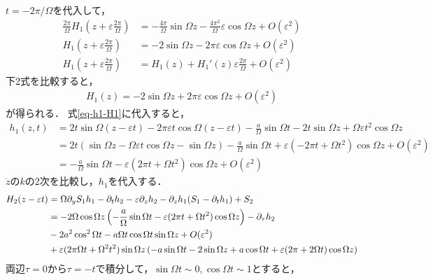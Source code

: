 \documentclass[../main]{subfiles}
\begin{document}
    $t=-2\pi/\Omega$を代入して，
    \begin{align*}
        \frac{2\pi}{\Omega}H_1\left(z+\varepsilon\frac{2\pi}{\Omega}\right)&=-\frac{4\pi}{\Omega}\sin\Omega z-\frac{4\pi^2}{\Omega}\varepsilon \cos \Omega z+O(\varepsilon^2)\\
        H_1\left(z+\varepsilon\frac{2\pi}{\Omega}\right)&=-2 \sin\Omega z-2\pi\varepsilon \cos \Omega z+O(\varepsilon^2)\\
        H_1\left(z+\varepsilon\frac{2\pi}{\Omega}\right)&=H_1(z)+H_1'(z)\varepsilon\frac{2\pi}{\Omega}+O(\varepsilon^2)
    \end{align*}
    下2式を比較すると，
    \begin{align*}
        H_1(z)=-2\sin\Omega z+2\pi\varepsilon \cos\Omega z+O(\varepsilon^2)
    \end{align*}
    が得られる．
    式\eqref{eq-h1-H1}に代入すると，
    \begin{align*}
        h_1(z,t)&=2t\sin\Omega(z-\varepsilon t)-2\pi\varepsilon t\cos\Omega(z-\varepsilon t)-\frac{a}{\Omega}\sin\Omega t-2t\sin \Omega z+\Omega\varepsilon t^2\cos \Omega z\\
        &=2t(\sin\Omega z-\Omega \varepsilon t\cos\Omega z-\sin\Omega z)-\frac{a}{\Omega}\sin\Omega t+\varepsilon(-2\pi t+\Omega t^2)\cos \Omega z+O(\varepsilon^2)\\
        &=-\frac{a}{\Omega}\sin\Omega t-\varepsilon(2\pi t+\Omega t^2)\cos \Omega z+O(\varepsilon^2)
    \end{align*}
    $\dot{z}のk$の2次を比較し，$h_1$を代入する．
    \begin{align*}
        H_2(z-\varepsilon t)&=\Omega \partial_y S_1h_1 -\partial_th_2-\varepsilon\partial_zh_2 -\partial_zh_1(S_1-\partial_th_1)+S_2\\
        &=-2\Omega \cos \Omega z\left( -\frac{a}{\Omega}\sin\Omega t-\varepsilon(2\pi t+\Omega t^2) \cos \Omega z \right)-\partial_\tau h_2\\
        &-2a^2\cos^2\Omega t-a\Omega t\cos \Omega t\sin \Omega z+O(\varepsilon^2)\\
        &+\varepsilon(2\pi\Omega t+\Omega^2 t^2)\sin\Omega z \left( -a\sin\Omega t-2\sin\Omega z +a\cos\Omega t+\varepsilon(2\pi +2\Omega t)\cos\Omega z\right)
    \end{align*}
    両辺$\tau=0$から$\tau=-t$で積分して，$\sin\Omega t\sim 0,\cos\Omega t\sim 1$とすると，
\end{document}
